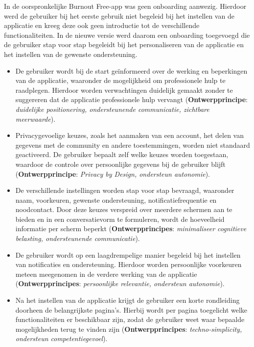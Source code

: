 In de oorspronkelijke Burnout Free-app was geen onboarding aanwezig. Hierdoor werd de gebruiker bij het eerste gebruik niet begeleid bij het instellen van de applicatie en kreeg deze ook geen introductie tot de verschillende functionaliteiten. In de nieuwe versie werd daarom een onboarding toegevoegd die de gebruiker stap voor stap begeleidt bij het personaliseren van de applicatie en het instellen van de gewenste ondersteuning.

\vspace{1em}

{\small
    \begin{itemize}
        \item De gebruiker wordt bij de start geïnformeerd over de werking en beperkingen van de applicatie, waaronder de mogelijkheid om professionele hulp te raadplegen. Hierdoor worden verwachtingen duidelijk gemaakt zonder te suggereren dat de applicatie professionele hulp vervangt (\textbf{Ontwerpprincipe}: \textit{duidelijke positionering, ondersteunende communicatie, zichtbare meerwaarde}).
        
        \item Privacygevoelige keuzes, zoals het aanmaken van een account, het delen van gegevens met de community en andere toestemmingen, worden niet standaard geactiveerd. De gebruiker bepaalt zelf welke keuzes worden toegestaan, waardoor de controle over persoonlijke gegevens bij de gebruiker blijft (\textbf{Ontwerpprincipe}: \textit{Privacy by Design, ondersteun autonomie}).
        
        \item De verschillende instellingen worden stap voor stap bevraagd, waaronder naam, voorkeuren, gewenste ondersteuning, notificatiefrequentie en noodcontact. Door deze keuzes verspreid over meerdere schermen aan te bieden en in een conversatievorm te formuleren, wordt de hoeveelheid informatie per scherm beperkt (\textbf{Ontwerpprincipes}: \textit{minimaliseer cognitieve belasting, ondersteunende communicatie}).
        
        \item De gebruiker wordt op een laagdrempelige manier begeleid bij het instellen van notificaties en ondersteuning. Hierdoor worden persoonlijke voorkeuren meteen meegenomen in de verdere werking van de applicatie (\textbf{Ontwerpprincipes}: \textit{persoonlijke relevantie, ondersteun autonomie}).
        
        \item Na het instellen van de applicatie krijgt de gebruiker een korte rondleiding doorheen de belangrijkste pagina's. Hierbij wordt per pagina toegelicht welke functionaliteiten er beschikbaar zijn, zodat de gebruiker weet waar bepaalde mogelijkheden terug te vinden zijn (\textbf{Ontwerpprincipes}: \textit{techno-simplicity, ondersteun competentiegevoel}).
    \end{itemize}
}

